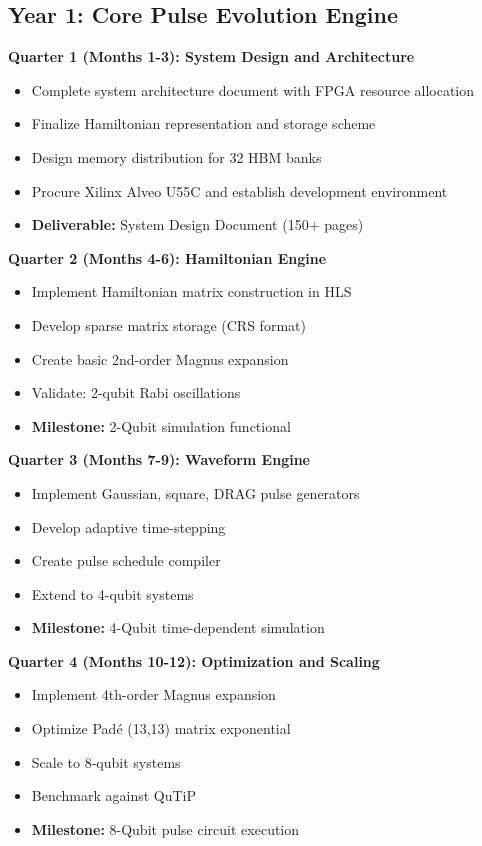 \documentclass[12pt,a4paper]{article}
\begin{document}
\subsection{Year 1: Core Pulse Evolution Engine}

\textbf{Quarter 1 (Months 1-3): System Design and Architecture}
\begin{itemize}[noitemsep]
    \item Complete system architecture document with FPGA resource allocation
    \item Finalize Hamiltonian representation and storage scheme
    \item Design memory distribution for 32 HBM banks
    \item Procure Xilinx Alveo U55C and establish development environment
    \item \textbf{Deliverable:} System Design Document (150+ pages)
\end{itemize}

\textbf{Quarter 2 (Months 4-6): Hamiltonian Engine}
\begin{itemize}[noitemsep]
    \item Implement Hamiltonian matrix construction in HLS
    \item Develop sparse matrix storage (CRS format)
    \item Create basic 2nd-order Magnus expansion
    \item Validate: 2-qubit Rabi oscillations
    \item \textbf{Milestone:} 2-Qubit simulation functional
\end{itemize}

\textbf{Quarter 3 (Months 7-9): Waveform Engine}
\begin{itemize}[noitemsep]
    \item Implement Gaussian, square, DRAG pulse generators
    \item Develop adaptive time-stepping
    \item Create pulse schedule compiler
    \item Extend to 4-qubit systems
    \item \textbf{Milestone:} 4-Qubit time-dependent simulation
\end{itemize}

\textbf{Quarter 4 (Months 10-12): Optimization and Scaling}
\begin{itemize}[noitemsep]
    \item Implement 4th-order Magnus expansion
    \item Optimize Padé (13,13) matrix exponential
    \item Scale to 8-qubit systems
    \item Benchmark against QuTiP
    \item \textbf{Milestone:} 8-Qubit pulse circuit execution
\end{itemize}
\end{document}

